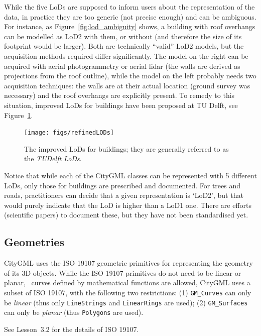 %

While the five LoDs are supposed to inform users about the representation of the data, in practice they are too generic (not precise enough) and can be ambiguous. 
For instance, as Figure~\ref{fig:lod_ambiguity} shows,
a building with roof overhangs can be modelled as LoD2 with them, or without (and therefore the size of its footprint would be larger).
Both are technically ``valid'' LoD2 models, but the acquisition methods required differ significantly.
The model on the right can be acquired with aerial photogrammetry or aerial lidar (the walls are derived as projections from the roof outline), while the model on the left probably needs two acquisition techniques: the walls are at their actual location (ground survey was necessary) and the roof overhangs are explicitly present.
To remedy to this situation, improved LoDs for buildings have been proposed at TU Delft, see Figure~\ref{fig:refinedLODs}.
\begin{figure}
  \centering
  \texttt{[image: figs/refinedLODs]}
  \caption{The improved LoDs for buildings; they are generally referred to as the \emph{TUDelft LoDs}.}%
\label{fig:refinedLODs}
\end{figure}

%

Notice that while each of the CityGML classes can be represented with 5 different LoDs, only those for buildings are prescribed and documented.
For trees and roads, practitioners can decide that a given representation is `LoD2', but that would purely indicate that the LoD is higher than a LoD1 one.
There are efforts (scientific papers) to document these, but they have not been standardised yet.


\subsection{Geometries}

CityGML uses the ISO 19107 geometric primitives for representing the geometry of its 3D objects.
While the ISO 19107 primitives do not need to be linear or planar, \ie\ curves defined by mathematical functions are allowed, CityGML uses a subset of ISO 19107, with the following two restrictions: (1) \texttt{GM\_Curves} can only be \emph{linear} (thus only \texttt{LineStrings} and \texttt{LinearRings} are used); (2) \texttt{GM\_Surfaces} can only be \emph{planar} (thus \texttt{Polygons} are used).

See Lesson~3.2 for the details of ISO 19107.



